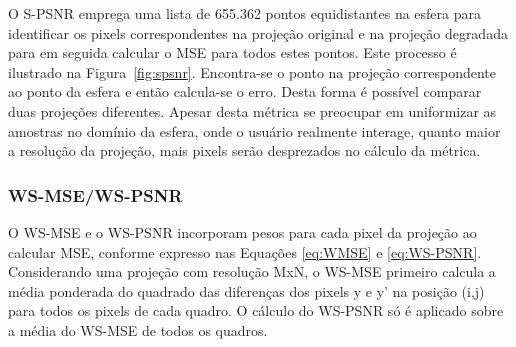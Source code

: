 O S-PSNR emprega uma lista de 655.362 pontos equidistantes na esfera para identificar os pixels correspondentes na projeção original e na projeção degradada para em seguida calcular o MSE para todos estes pontos. Este processo é ilustrado na Figura~\ref{fig:spsnr}. Encontra-se o ponto na projeção correspondente ao ponto da esfera e então calcula-se o erro. Desta forma é possível comparar duas projeções diferentes. Apesar desta métrica se preocupar em uniformizar as amostras no domínio da esfera, onde o usuário realmente interage, quanto maior a resolução da projeção, mais pixels serão desprezados no cálculo da métrica.

\begin{figure}[h]
        \centering
        \quad
\end{figure}

\subsubsection{WS-MSE/WS-PSNR}

O WS-MSE e o WS-PSNR incorporam pesos para cada pixel da projeção ao calcular MSE, conforme expresso nas Equações \ref{eq:WMSE} e \ref{eq:WS-PSNR}. Considerando uma projeção com resolução MxN, o WS-MSE primeiro calcula a média ponderada do quadrado das diferenças dos pixels y e y' na posição (i,j) para todos os pixels de cada quadro. O cálculo do WS-PSNR só é aplicado sobre a média do WS-MSE de todos os quadros.

